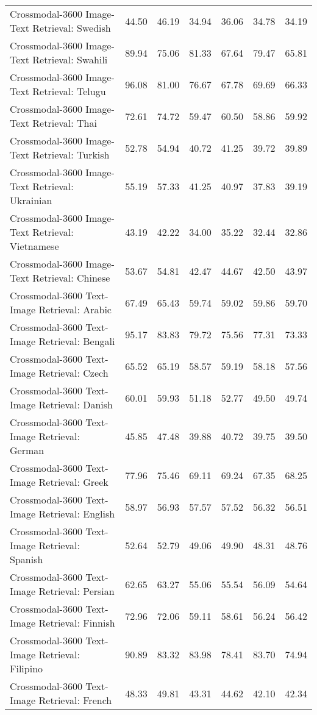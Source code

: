 {\begin{longtable}{l|rr|rr|rr}
Crossmodal-3600 Image-Text Retrieval: Swedish & 44.50 & 46.19 & 34.94 & 36.06 & 34.78 & 34.19 \\
Crossmodal-3600 Image-Text Retrieval: Swahili & 89.94 & 75.06 & 81.33 & 67.64 & 79.47 & 65.81 \\
Crossmodal-3600 Image-Text Retrieval: Telugu & 96.08 & 81.00 & 76.67 & 67.78 & 69.69 & 66.33 \\
Crossmodal-3600 Image-Text Retrieval: Thai & 72.61 & 74.72 & 59.47 & 60.50 & 58.86 & 59.92 \\
Crossmodal-3600 Image-Text Retrieval: Turkish & 52.78 & 54.94 & 40.72 & 41.25 & 39.72 & 39.89 \\
Crossmodal-3600 Image-Text Retrieval: Ukrainian & 55.19 & 57.33 & 41.25 & 40.97 & 37.83 & 39.19 \\
Crossmodal-3600 Image-Text Retrieval: Vietnamese & 43.19 & 42.22 & 34.00 & 35.22 & 32.44 & 32.86 \\
Crossmodal-3600 Image-Text Retrieval: Chinese & 53.67 & 54.81 & 42.47 & 44.67 & 42.50 & 43.97 \\
Crossmodal-3600 Text-Image Retrieval: Arabic & 67.49 & 65.43 & 59.74 & 59.02 & 59.86 & 59.70 \\
Crossmodal-3600 Text-Image Retrieval: Bengali & 95.17 & 83.83 & 79.72 & 75.56 & 77.31 & 73.33 \\
Crossmodal-3600 Text-Image Retrieval: Czech & 65.52 & 65.19 & 58.57 & 59.19 & 58.18 & 57.56 \\
Crossmodal-3600 Text-Image Retrieval: Danish & 60.01 & 59.93 & 51.18 & 52.77 & 49.50 & 49.74 \\
Crossmodal-3600 Text-Image Retrieval: German & 45.85 & 47.48 & 39.88 & 40.72 & 39.75 & 39.50 \\
Crossmodal-3600 Text-Image Retrieval: Greek & 77.96 & 75.46 & 69.11 & 69.24 & 67.35 & 68.25 \\
Crossmodal-3600 Text-Image Retrieval: English & 58.97 & 56.93 & 57.57 & 57.52 & 56.32 & 56.51 \\
Crossmodal-3600 Text-Image Retrieval: Spanish & 52.64 & 52.79 & 49.06 & 49.90 & 48.31 & 48.76 \\
Crossmodal-3600 Text-Image Retrieval: Persian & 62.65 & 63.27 & 55.06 & 55.54 & 56.09 & 54.64 \\
Crossmodal-3600 Text-Image Retrieval: Finnish & 72.96 & 72.06 & 59.11 & 58.61 & 56.24 & 56.42 \\
Crossmodal-3600 Text-Image Retrieval: Filipino & 90.89 & 83.32 & 83.98 & 78.41 & 83.70 & 74.94 \\
Crossmodal-3600 Text-Image Retrieval: French & 48.33 & 49.81 & 43.31 & 44.62 & 42.10 & 42.34 \\

\end{longtable}}
